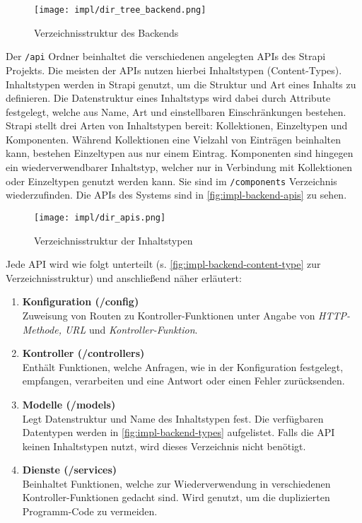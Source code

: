 \begin{figure}[htpb]
    \centering
    \texttt{[image: impl/dir\_tree\_backend.png]}
    \caption{Verzeichnisstruktur des Backends}
    \label{fig:impl-backend-structure}
\end{figure}

Der \lstinline[style=code, style=inline]{/api} Ordner beinhaltet die
verschiedenen angelegten APIs des Strapi Projekts. Die meisten der APIs nutzen
hierbei Inhaltstypen (Content-Types). Inhaltstypen werden in Strapi genutzt, um
die Struktur und Art eines Inhalts zu definieren. Die Datenstruktur eines
Inhaltstyps wird dabei durch Attribute festgelegt, welche aus Name, Art und
einstellbaren Einschränkungen bestehen. Strapi stellt drei Arten von
Inhaltstypen bereit: Kollektionen, Einzeltypen und Komponenten. Während
Kollektionen eine Vielzahl von Einträgen beinhalten kann, bestehen Einzeltypen
aus nur einem Eintrag. Komponenten sind hingegen ein wiederverwendbarer
Inhaltstyp, welcher nur in Verbindung mit Kollektionen oder Einzeltypen genutzt
werden kann. Sie sind im \lstinline[style=code, style=inline]{/components}
Verzeichnis wiederzufinden. Die APIs des Systems sind in
\autoref{fig:impl-backend-apis} zu sehen.

\begin{figure}[htpb]
    \centering
    \texttt{[image: impl/dir\_apis.png]}
    \caption{Verzeichnisstruktur der Inhaltstypen}
    \label{fig:impl-backend-apis}
\end{figure}

Jede API wird wie folgt unterteilt (s. \autoref{fig:impl-backend-content-type}
zur Verzeichnisstruktur) und anschließend näher erläutert:

\begin{enumerate}
    \setlength{\itemsep}{1em}
    \item \textbf{Konfiguration (/config)} \\
          Zuweisung von Routen zu Kontroller-Funktionen unter Angabe von
          \textit{HTTP-Methode, URL} und \textit{Kontroller-Funktion}.
    \item \textbf{Kontroller (/controllers)} \\
          Enthält Funktionen, welche Anfragen, wie in der Konfiguration
          festgelegt, empfangen, verarbeiten und eine Antwort oder einen Fehler
          zurücksenden.
    \item \textbf{Modelle (/models)} \\
          Legt Datenstruktur und Name des Inhaltstypen fest. Die verfügbaren
          Datentypen werden in \autoref{fig:impl-backend-types} aufgelistet.
          Falls die API keinen Inhaltstypen nutzt, wird dieses Verzeichnis nicht
          benötigt.
    \item \textbf{Dienste (/services)} \\
          Beinhaltet Funktionen, welche zur Wiederverwendung in verschiedenen
          Kontroller-Funktionen gedacht sind. Wird genutzt, um die duplizierten
          Programm-Code zu vermeiden.
\end{enumerate}

